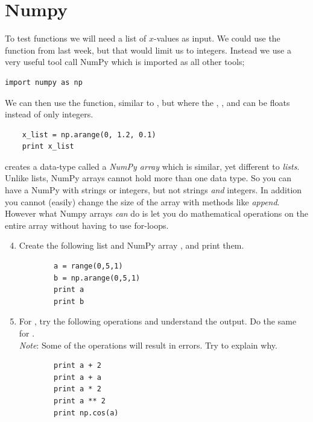 \documentclass{article}
\begin{document}
\section{Numpy}

To test functions we will need a list of $x$-values as input.
We could use the  function from last week, but that would limit us to integers.
Instead we use a very useful tool call NumPy which is imported as all other tools;

\begin{lstlisting}
import numpy as np
\end{lstlisting}

We can then use the  function, similar to , but where the
,
, and
can be floats instead of only integers.

\begin{lstlisting}
    x_list = np.arange(0, 1.2, 0.1)
    print x_list
\end{lstlisting}

 creates a data-type called a {\em NumPy array} which is similar, yet different to {\em lists}.
Unlike lists, NumPy arrays cannot hold more than one data type. So you can have a NumPy with strings or integers, but not strings {\em and} integers.
In addition you cannot (easily) change the size of the array with methods like {\em append}.
However what Numpy arrays {\em can} do is let you do mathematical operations on the entire array without having to use for-loops.

\begin{enumerate}
    \setcounter{enumi}{3}
    \item Create the following list  and NumPy array , and print them.
        \begin{lstlisting}
        a = range(0,5,1)
        b = np.arange(0,5,1)
        print a
        print b
        \end{lstlisting}

    \item For , try the following operations and understand the output. Do the same for . \\
        {\em Note}: Some of the operations will result in errors. Try to explain why.
        \begin{lstlisting}
        print a + 2
        print a + a
        print a * 2
        print a ** 2
        print np.cos(a)
        \end{lstlisting}
\end{enumerate}
\end{document}
